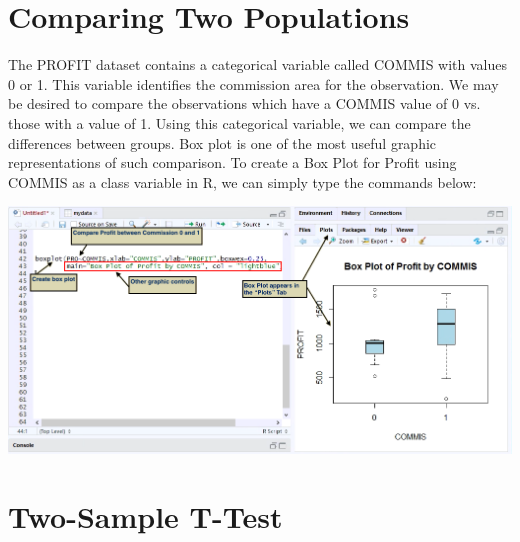 \documentclass[a4paper]{report}
\begin{document}
    \section{Comparing Two Populations}
    
        \begin{flushleft}
        The PROFIT dataset contains a categorical variable called COMMIS with values 0 or 1. This variable identifies the commission area for the observation. We may be desired to compare the observations which have a COMMIS value of 0 vs. those with a value of 1. Using this categorical variable, we can compare the differences between groups. Box plot is one of the most useful graphic representations of such comparison. To create a Box Plot for Profit using COMMIS as a class variable in R, we can simply type the commands below:

         \includegraphics[width=\textwidth]{images/BXPLT1.png}
        \end{flushleft}
        
    \section{Two-Sample T-Test}
    
\end{document}
